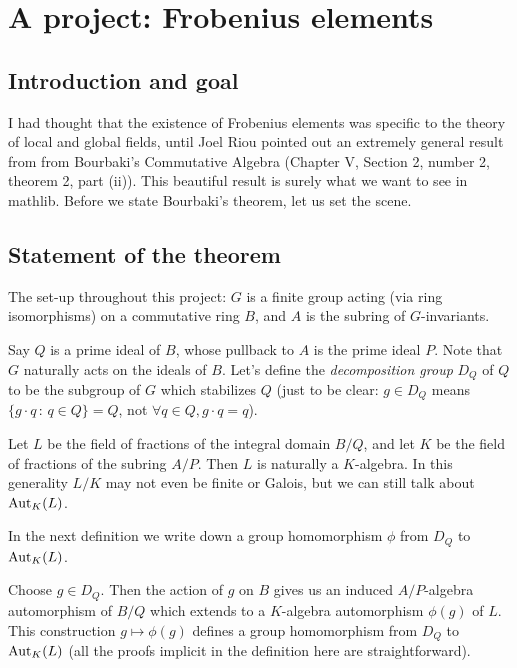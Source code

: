 \chapter{A project: Frobenius elements}\label{Frobenius_project}

\section{Introduction and goal}

I had thought that the existence of Frobenius elements was specific to the theory
of local and global fields, until Joel Riou pointed out
an extremely general result from from Bourbaki's Commutative Algebra
(Chapter V, Section 2, number 2, theorem 2, part (ii)). This beautiful
result is surely what we want to see in mathlib. Before we state Bourbaki's
theorem, let us set the scene.

\section{Statement of the theorem}

The set-up throughout this project:
$G$ is a finite group acting (via ring isomorphisms) on a commutative ring $B$,
and $A$ is the subring of $G$-invariants.

Say $Q$ is a prime ideal of $B$, whose pullback to $A$ is the prime ideal $P$.
Note that $G$ naturally acts on the ideals of $B$. Let's define the
\emph{decomposition group} $D_Q$ of $Q$ to be the subgroup of $G$ which
stabilizes $Q$ (just to be clear: $g\in D_Q$ means
$\{g\cdot q\, :\, q \in Q\}=Q$, not $\forall q\in Q, g\cdot q=q$).

Let $L$ be the field of fractions of the integral domain $B/Q$, and let $K$ be the
field of fractions of the subring $A/P$. Then $L$ is naturally a $K$-algebra.
In this generality $L/K$ may not even be finite or Galois, but we can still talk about
$\operatorname{Aut}_K(L)$.

In the next definition we write down a group homomorphism $\phi$ from $D_Q$ to $\operatorname{Aut}_K(L)$.

\begin{definition}
  \label{Bourbaki52222.stabilizer.toGaloisGroup}
  Choose $g\in D_Q$. Then the action of $g$ on $B$ gives us an induced
  $A/P$-algebra automorphism of $B/Q$ which extends to a $K$-algebra automorphism $\phi(g)$ of $L$.
  This construction $g\mapsto \phi(g)$ defines a group homomorphism from $D_Q$
  to $\operatorname{Aut}_K(L)$ (all the proofs implicit in the definition here are straightforward).
  \leanok
\end{definition}

